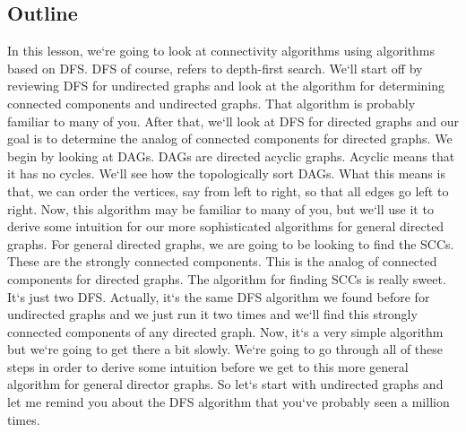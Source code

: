\subsection{Outline}
In this lesson, we`re going to look at connectivity algorithms using algorithms based on DFS\@.
DFS of course, refers to depth-first search.
We`ll start off by reviewing DFS for undirected graphs and look at the algorithm for determining connected components and undirected graphs.
That algorithm is probably familiar to many of you.
After that, we`ll look at DFS for directed graphs and our goal is to determine the analog of connected components for directed graphs.
We begin by looking at DAGs.
DAGs are directed acyclic graphs.
Acyclic means that it has no cycles.
We`ll see how the topologically sort DAGs.
What this means is that, we can order the vertices, say from left to right, so that all edges go left to right.
Now, this algorithm may be familiar to many of you, but we`ll use it to derive some intuition for our more sophisticated algorithms for general directed graphs.
For general directed graphs, we are going to be looking to find the SCCs.
These are the strongly connected components.
This is the analog of connected components for directed graphs.
The algorithm for finding SCCs is really sweet.
It`s just two DFS\@.
Actually, it`s the same DFS algorithm we found before for undirected graphs and we just run it two times and we`ll find this strongly connected components of any directed graph.
Now, it`s a very simple algorithm but we`re going to get there a bit slowly.
We`re going to go through all of these steps in order to derive some intuition before we get to this more general algorithm for general director graphs.
So let`s start with undirected graphs and let me remind you about the DFS algorithm that you`ve probably seen a million times.

